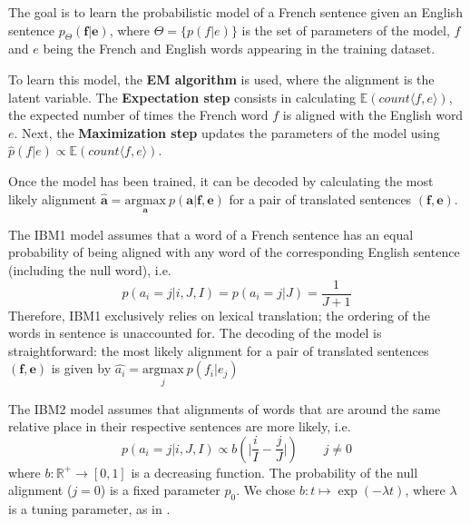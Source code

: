 \documentclass[final]{beamer}
\begin{document}
\begin{frame}[t]
\begin{multicols}{3}
The goal is to learn the probabilistic model of a French sentence given an English sentence $p_\Theta (\textbf{f} \vert \textbf{e})$, where $\Theta = \lbrace  p(f \vert e)\rbrace$ is the set of parameters of the model, $f$ and $e$ being the French and English words appearing in the training dataset.

To learn this model, the \textbf{EM algorithm} is used, where the alignment is the latent variable. The \textbf{Expectation step} consists in calculating $\mathbb{E}(count \langle f, e \rangle)$, the expected number of times the French word $f$ is aligned with the English word $e$. Next, the \textbf{Maximization step} updates the parameters of the model using $\hat{p}(f \vert e) \propto \mathbb{E}(count \langle f,e \rangle)$.

Once the model has been trained, it can be decoded by calculating the most likely alignment $\hat{\mathbf{a}} = \underset{\mathbf{a}}{\mathrm{argmax}} \ p(\mathbf{a} \vert \mathbf{f}, \mathbf{e})$ for a pair of translated sentences $(\textbf{f}, \textbf{e})$.
\medskip
\begin{center}
\end{center}
\medskip

The IBM1 model assumes that a word of a French sentence has an equal probability of being aligned with any word of the corresponding English sentence (including the null word), i.e. 
\begin{equation*}
p(a_i = j \vert i, J, I) = p(a_i = j \vert J) = \frac{1}{J + 1}
\end{equation*}
Therefore, IBM1 exclusively relies on lexical translation; the ordering of the words in sentence is unaccounted for. The decoding of the model is straightforward: the most likely alignment for a pair of translated sentences $(\textbf{f}, \textbf{e})$ is given by $\hat{a_i} =\underset{j}{\mathrm{argmax}} \ p(f_{i} \vert e_{j})$

\medskip
\begin{center}
\end{center}
\medskip

The IBM2 model assumes that alignments of words that are around the same relative place in their respective sentences are more likely, i.e. 
\begin{equation*}
p(a_i = j \vert i, J, I) \propto b( \vert \frac{i}{I} - \frac{j}{J} \vert) \qquad j \neq 0
\end{equation*}
where $b: \mathbb{R}^{+} \to [0, 1]$ is a decreasing function. The probability of the null alignment ($j=0$) is a fixed parameter $p_0$. We chose $b: t \mapsto \exp (- \lambda t)$, where $\lambda$ is a tuning parameter, as in \cite{dyer}.


\end{multicols}
\end{frame}
\end{document}
